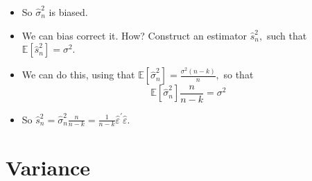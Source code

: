 \documentclass[notes=show]{beamer}
\begin{document}
\begin{frame}%

\begin{itemize}
\item So $\widehat{\sigma }_{n}^{2}$ is biased.

\item We can bias correct it. How? Construct an estimator $\widehat{s}%
_{n}^{2},$ such that $\mathbb{E}[\widehat{s}_{n}^{2}]=\sigma ^{2}.$

\item We can do this, using that $\mathbb{E}[\widehat{\sigma }_{n}^{2}]=%
\frac{\sigma ^{2}(n-k)}{n},$ so that%
\begin{equation*}
\mathbb{E}[\widehat{\sigma }_{n}^{2}]\frac{n}{n-k}=\sigma ^{2}
\end{equation*}

\item So $\widehat{s}_{n}^{2}=\widehat{\sigma }_{n}^{2}\frac{n}{n-k}=\frac{1%
}{n-k}\widehat{\varepsilon }^{\prime }\widehat{\varepsilon }.$
\end{itemize}

\end{frame}%

\section{Variance}
\end{document}
